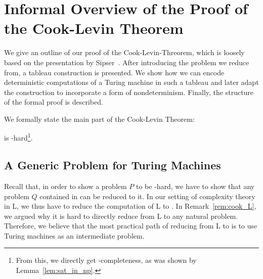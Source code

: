 \newcommand*{\gennp}{\textbf{TMGenNP}}

\newcommand{\strent}{\rightsquigarrow}
\newcommand{\Rfinal}{R_{\text{final}}}


\newcommand{\BPR}{\textbf{BinaryPR}}
\newcommand{\fsat}{\textbf{FSAT}}
\newcommand{\sat}{\textbf{SAT}}

\newcommand{\rewwin}[2]{
  \begin{tabular}{C|C|C}
    #1 \\ 
    \midrule #2
  \end{tabular}
}

\newcommand{\blank}{\textbf{\textvisiblespace}}
\newcommand{\delim}{\#}

\newcommand{\polarity}{\textsf{polarity}}


\newcommand*{\TallestContent}{\ensuremath{b}}%

\newcommand{\polneg}[1]{\overleftarrow{#1\vphantom{\TallestContent}}}
\newcommand{\polpos}[1]{\overrightarrow{#1\vphantom{\TallestContent}}}
\newcommand{\polneut}[1]{\overline{#1\vphantom{\TallestContent}}}

\newcommand{\reprt}[1]{\ensuremath{\sim_t^{#1}}}
\newcommand{\reprtt}[2]{\ensuremath{\sim_t^{(#1, #2)}}}
\newcommand{\reprc}{\ensuremath{\sim_c}}



\chapter{Informal Overview of the Proof of the Cook-Levin Theorem}\label{chap:informaloverview}
We give an outline of our proof of the Cook-Levin-Threorem, which is loosely based on the presentation by Sipser~\cite{Sipser:TheoryofComputation}. After introducing the problem we reduce from, a tableau construction is presented. We show how we can encode deterministic computations of a Turing machine in such a tableau and later adapt the construction to incorporate a form of nondeterminism. Finally, the structure of the formal proof is described. 

We formally state the main part of the Cook-Levin Theorem:
\begin{theorem}
  \SAT{} is \NP{}-hard\footnote{From this, we directly get \NP{}-completeness, as was shown by Lemma~\ref{lem:sat_in_np}.}.
\end{theorem}

\section{A Generic Problem for Turing Machines}
Recall that, in order to show a problem $P$ to be \NP{}-hard, we have to show that any problem $Q$ contained in \NP{} can be reduced to it. In our setting of complexity theory in L, we thus have to reduce the computation of L to \SAT{}.
In Remark~\ref{rem:cook_L}, we argued why it is hard to directly reduce from L to any natural problem. 
Therefore, we believe that the most practical path of reducing from L to \SAT{} is to use Turing machines as an intermediate problem. 

